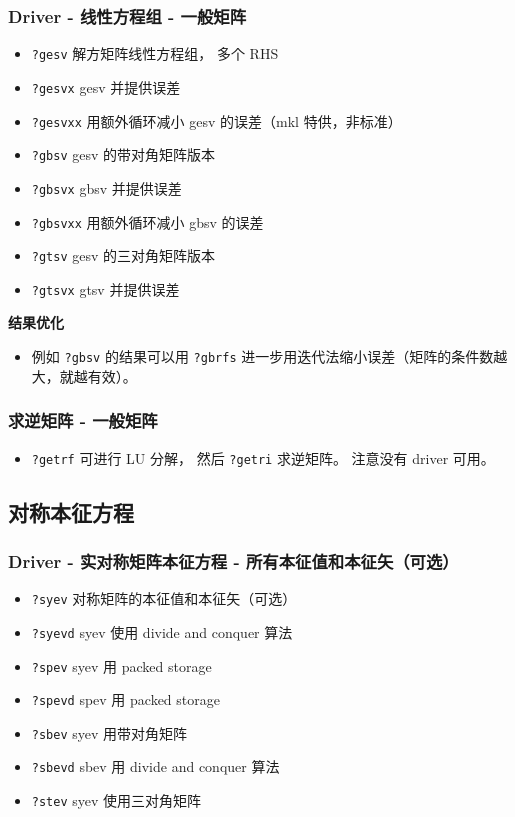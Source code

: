\subsubsection{Driver - 线性方程组 - 一般矩阵}
\begin{itemize}
\item \verb|?gesv| 解方矩阵线性方程组， 多个 RHS
\item \verb|?gesvx| gesv 并提供误差
\item \verb|?gesvxx| 用额外循环减小 gesv 的误差（mkl 特供，非标准）
\item \verb|?gbsv| gesv 的带对角矩阵版本
\item \verb|?gbsvx| gbsv 并提供误差
\item \verb|?gbsvxx| 用额外循环减小 gbsv 的误差
\item \verb|?gtsv| gesv 的三对角矩阵版本
\item \verb|?gtsvx| gtsv 并提供误差
\end{itemize}

\textbf{结果优化}
\begin{itemize}
\item 例如 \verb|?gbsv| 的结果可以用 \verb|?gbrfs| 进一步用迭代法缩小误差（矩阵的条件数越大，就越有效）。
\end{itemize}

\subsubsection{求逆矩阵 - 一般矩阵}
\begin{itemize}
\item \verb|?getrf| 可进行 LU 分解， 然后 \verb|?getri| 求逆矩阵。 注意没有 driver 可用。
\end{itemize}


\subsection{对称本征方程}
\subsubsection{Driver - 实对称矩阵本征方程 - 所有本征值和本征矢（可选）}
\begin{itemize}
\item \verb|?syev| 对称矩阵的本征值和本征矢（可选）
\item \verb|?syevd| syev 使用 divide and conquer 算法
\item \verb|?spev| syev 用 packed storage
\item \verb|?spevd| spev 用 packed storage
\item \verb|?sbev| syev 用带对角矩阵
\item \verb|?sbevd| sbev 用 divide and conquer 算法
\item \verb|?stev| syev 使用三对角矩阵
\end{itemize}


